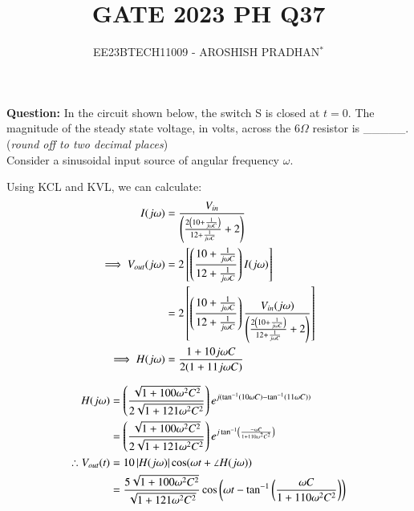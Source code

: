 \documentclass[journal,12pt,twocolumn]{IEEEtran}
\theoremstyle{remark}
\begin{document}

\vspace{3cm}

\title{GATE 2023 PH Q37}
\author{EE23BTECH11009 - AROSHISH PRADHAN$^{*}$%
}
\maketitle
\newpage
\bigskip
\textbf{Question:} In the circuit shown below, the switch S is closed at $t=0$. The magnitude of the steady state voltage, in volts, across the $6\Omega$ resistor is \_\_\_\_\_.(\textit{round off to two decimal places})
\\

\solution 
Consider a sinusoidal input source of angular frequency $\omega$.


Using KCL and KVL, we can calculate:
\begin{align}
    I(j\omega) &= \frac{V_{in}}{\left(\frac{2\left(10 + \frac{1}{j\omega C}\right)}{12 + \frac{1}{j \omega C}}+2\right)}\\
    \implies V_{out}(j\omega) &= 2{}\left[\left(\frac{10 + \frac{1}{j\omega C}}{12 + \frac{1}{j\omega C}}\right)I(j\omega)\right]\\
    &= 2{}\left[\left(\frac{10 + \frac{1}{j\omega C}}{12 + \frac{1}{j\omega C}}\right)\frac{V_{in}(j\omega)}{\left(\frac{2\left(10 + \frac{1}{j\omega C}\right)}{12 + \frac{1}{j \omega C}}+2\right)}\right]\\
    \implies H(j\omega) &= \frac{1 + 10j\omega C}{2(1 + 11j\omega C)}
\end{align}

\begin{align}
    H(j\omega) &= \left(\frac{\sqrt{1 + 100\omega^2 C^2}}{2\sqrt{1 + 121\omega^2 C^2}}\right)e^{j(\tan^{-1}(10\omega C) - \tan^{-1}(11\omega C))}\\
    &= \left(\frac{\sqrt{1 + 100\omega^2 C^2}}{2\sqrt{1 + 121\omega^2 C^2}}\right)e^{j\tan^{-1}\left(\frac{-\omega C}{1 + 110\omega^2 C^2}\right)}\\
    \therefore V_{out}(t) &= 10\left\vert H(j\omega)\right\vert\cos(\omega t + \angle H(j\omega))\\
    &= \frac{5\sqrt{1 + 100\omega^2 C^2}}{\sqrt{1 + 121\omega^2 C^2}}\cos\left(\omega t -\tan^{-1}\left(\frac{\omega C}{1 + 110\omega^2 C^2}\right)\right)
\end{align}
\end{document}
